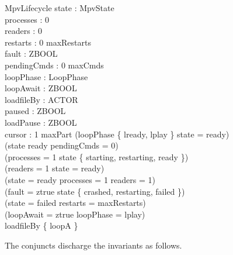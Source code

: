 \documentclass[a4paper,10pt,fleqn]{article}
\begin{document}
\begin{schema}{MpvLifecycle}
  state : MpvState \\
  processes : 0  \\
  readers : 0  \\
  restarts : 0 \upto maxRestarts \\
  fault : ZBOOL \\
  pendingCmds : 0 \upto maxCmds \\
  loopPhase : LoopPhase \\
  loopAwait : ZBOOL \\
  loadfileBy : \power ACTOR \\
  paused : ZBOOL \\
  loadPause : ZBOOL \\
  cursor : 1 \upto maxPart
  \where
  (loopPhase \in \{ lready, lplay \} \implies state = ready) \\
  (state \neq ready \implies pendingCmds = 0) \\
  (processes = 1 \iff state \in \{ starting, restarting, ready \}) \\
  (readers = 1 \iff state = ready) \\
  (state = ready \iff processes = 1 \land readers = 1) \\
  (fault = ztrue \iff state \in \{ crashed, restarting, failed \}) \\
  (state = failed \implies restarts = maxRestarts) \\
  (loopAwait = ztrue \iff loopPhase = lplay) \\
  loadfileBy \subseteq \{ loopA \}
\end{schema}

The conjuncts discharge the invariants as follows.
\end{document}
